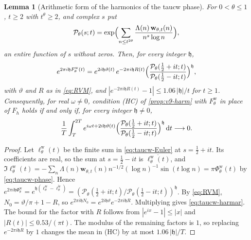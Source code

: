 \documentclass[11pt,a4paper]{article}
\numberwithin{equation}{section}
\newtheorem{lemma}[theorem]{Lemma}
\theoremstyle{definition}
\theoremstyle{remark}
\newcommand{\dd}{\,\mathrm dt}
\begin{document}
\begin{lemma}[Arithmetic form of the harmonics of the taucw phase]\label{lem:taucw-harmar}
For $0<\theta\le1$, $t\ge2$ with $t^\theta\ge2$, and complex $s$ put
\begin{equation}\label{eq:taucw-Euler}
\mathcal P_\theta(s;t)=\exp\Bigl(\sum_{n\le t^{2\theta}}\frac{\Lambda(n)\,\mathbf w_{\theta,t}(n)}{n^s\log n}\Bigr),
\end{equation}
an entire function of $s$ without zeros. Then, for every integer $\mathfrak h$,
\begin{equation}\label{eq:taucw-harmar}
e^{2\pi i\mathfrak hF^{\mathrm w}_\theta(t)}=e^{2i\mathfrak h\vartheta(t)}\,e^{-2\pi i\mathfrak hR(t)}\Bigl(\frac{\mathcal P_\theta(\frac12+it;t)}{\mathcal P_\theta(\frac12-it;t)}\Bigr)^{\mathfrak h},
\end{equation}
with $\vartheta$ and $R$ as in \eqref{eq:RVM}, and $|e^{-2\pi i\mathfrak hR(t)}-1|\le1.06\,|\mathfrak h|/t$ for $t\ge1$. Consequently, for real $\omega\ne0$, condition (HC) of \cref{prop:v9-harm} with $F^{\mathrm w}_\theta$ in place of $F_h$ holds if and only if, for every integer $\mathfrak h\ne0$,
\begin{equation}\label{eq:taucw-harmar-HC}
\frac1T\int_T^{2T}e^{i\omega t+2i\mathfrak h\vartheta(t)}\Bigl(\frac{\mathcal P_\theta(\frac12+it;t)}{\mathcal P_\theta(\frac12-it;t)}\Bigr)^{\mathfrak h}\dd\longrightarrow0 .
\end{equation}
\end{lemma}
\begin{proof}
Let $\ell^{\mathrm w}_\theta(t)$ be the finite sum in \eqref{eq:taucw-Euler} at $s=\frac12+it$. Its coefficients are real, so the sum at $s=\frac12-it$ is $\overline{\ell^{\mathrm w}_\theta(t)}$, and $\Im\ell^{\mathrm w}_\theta(t)=-\sum_n\Lambda(n)\mathbf w_{\theta,t}(n)n^{-1/2}(\log n)^{-1}\sin(t\log n)=\pi\Phi^{\mathrm w}_\theta(t)$ by \eqref{eq:taucw-phase}. Hence $e^{2\pi i\mathfrak h\Phi^{\mathrm w}_\theta}=e^{\mathfrak h(\ell^{\mathrm w}_\theta-\overline{\ell^{\mathrm w}_\theta})}=(\mathcal P_\theta(\frac12+it;t)/\mathcal P_\theta(\frac12-it;t))^{\mathfrak h}$. By \eqref{eq:RVM}, $N_0=\vartheta/\pi+1-R$, so $e^{2\pi i\mathfrak hN_0}=e^{2i\mathfrak h\vartheta}e^{-2\pi i\mathfrak hR}$. Multiplying gives \eqref{eq:taucw-harmar}. The bound for the factor with $R$ follows from $|e^{ix}-1|\le|x|$ and $|R(t)|\le0.53/(\pi t)$. The modulus of the remaining factors is $1$, so replacing $e^{-2\pi i\mathfrak hR}$ by $1$ changes the mean in (HC) by at most $1.06\,|\mathfrak h|/T$.
\end{proof}
\end{document}
